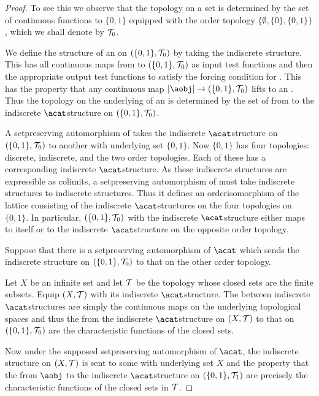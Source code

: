 \documentclass[%
12pt,%
arxiv,%
defaults
]{myclass}
\begin{document}
\begin{proof}
To see this we observe that the topology on a set is determined by the set of continuous functions to \(\{0,1\}\) equipped with the order topology \(\{\emptyset, \{0\}, \{0,1\}\}\), which we shall denote by \(\mathcal{T}_0\).

We define the structure of an \aobj on \((\{0,1\}, \mathcal{T}_0)\) by taking the indiscrete structure.
This has all continuous maps from \tobjs to \((\{0,1\}, \mathcal{T}_0)\) as input test functions and then the appropriate output test functions to satisfy the forcing condition for \acat.
This has the property that any continuous map \(\forfunc[\aobj] \to (\{0,1\}, \m{T}_0)\) lifts to an \amor.
Thus the topology on the underlying \yobj of an \aobj[\aobj] is determined by the set of \amors from \aobj to the indiscrete \(\acat\)\enhyp{}structure on \((\{0,1\}, \mathcal{T}_0)\).

A set\enhyp{}preserving automorphism of \acat takes the indiscrete \(\acat\)\enhyp{}structure on \((\{0,1\}, \mathcal{T}_0)\) to another \aobj with underlying set \(\{0,1\}\).
Now \(\{0,1\}\) has four topologies: discrete, indiscrete, and the two order topologies.
Each of these has a corresponding indiscrete \(\acat\)\enhyp{}structure.
As these indiscrete structures are expressible as colimits, a set\enhyp{}preserving automorphism of \acat must take indiscrete structures to indiscrete structures.
Thus it defines an order\enhyp{}isomorphism of the lattice consisting of the indiscrete \(\acat\)\enhyp{}structures on the four topologies on \(\{0,1\}\).
In particular, \((\{0,1\}, \mathcal{T}_0)\) with the indiscrete \(\acat\)\enhyp{}structure either maps to itself or to the indiscrete \(\acat\)\enhyp{}structure on the opposite order topology.

Suppose that there is a set\enhyp{}preserving automorphism of \(\acat\) which sends the indiscrete structure on \((\{0,1\}, \mathcal{T}_0)\) to that on the other order topology.

Let \(X\) be an infinite set and let \(\mathcal{T}\) be the topology whose closed sets are the finite subsets.
Equip \((X, \mathcal{T})\) with its indiscrete \(\acat\)\enhyp{}structure.
The \amors between indiscrete \(\acat\)\enhyp{}structures are simply the continuous maps on the underlying topological spaces and thus the \amors from the indiscrete \(\acat\)\enhyp{}structure on \((X,\mathcal{T})\) to that on \((\{0,1\}, \mathcal{T}_0)\) are the characteristic functions of the closed sets.

Now under the supposed set\enhyp{}preserving automorphism of \(\acat\), the indiscrete structure on \((X, \mathcal{T})\) is sent to some \aobj[\aobj] with underlying set \(X\) and the property that the \amors from \(\aobj\) to the indiscrete \(\acat\)\enhyp{}structure on \((\{0,1\}, \mathcal{T}_1)\) are precisely the characteristic functions of the closed sets in \(\mathcal{T}\).


\end{proof}
\end{document}
